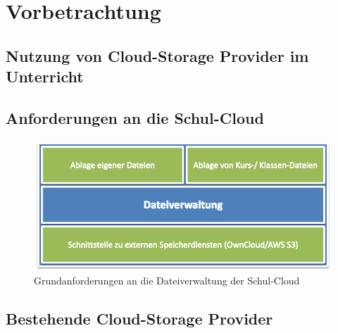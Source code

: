 \section{Vorbetrachtung}
\label{sec:relatedwork}

\subsection{Nutzung von Cloud-Storage Provider im Unterricht}


\subsection{Anforderungen an die Schul-Cloud}

\begin{center}
	
	\begin{figure}[H]
		\begin{center}
			\includegraphics[width=0.8\linewidth]{images/AnforderungenDateiverwaltung}
			\caption[Caption for relatedWork]{Grundanforderungen an die Dateiverwaltung der Schul-Cloud\footnotemark}
			\label{fig:devices}
		\end{center}
	\end{figure}
\end{center}


\subsection{Bestehende Cloud-Storage Provider}


\clearpage
